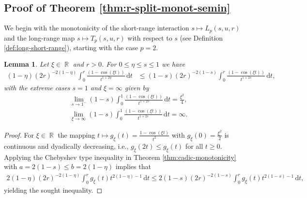 \documentclass[12pt, reqno]{amsart}%
\theoremstyle{plain}  %
\newtheorem{lemma}[theorem]{Lemma}
\theoremstyle{definition}  %
\theoremstyle{remark}
\numberwithin{equation}{section}
\DeclareMathOperator{\R}{\mathbb{R}}
\renewcommand{\d}{\,\mathrm{d}}
\begin{document}
\subsection{Proof of Theorem \ref{thm:r-split-monot-semin}} \label{sec:r-split-monot-semin}
We begin with the monotonicity of the short-range interaction $s \mapsto L_p(s,u,r)$ and the long-range map $s \mapsto T_p(s,u,r)$ with respect to $s$ (see Definition \ref{def:long-short-range}), starting with the case $p=2$.
\begin{lemma}\label{lem:short-cos}
Let  $\xi\in\R$ and $r>0$.  For $0\leq \eta\leq s\leq 1$ we have
\begin{align*}
(1-\eta) (2r)^{-2(1-\eta)} \int_0^r\frac{(1-\cos (\xi t))}{t^{1+2\eta}}\d t&\leq (1-s)  (2r)^{-2(1-s)} \int_0^r \frac{(1-\cos (\xi t))}{t^{1+2s}}\d t,
\end{align*}
with the extreme cases $s=1$ and $\xi=\infty$  given by
\begin{align*}
&\lim_{s\to 1^-}(1-s)  \int_0^1 \frac{(1-\cos (\xi t))}{t^{1+2s}}\d t=\frac{\xi^2}{4},\\
&\lim_{\xi\to \infty}(1-s) \int_0^1 \frac{(1-\cos (\xi t))}{t^{1+2s}}\d t =\infty.
\end{align*}
\end{lemma}
\begin{proof}
For $\xi\in \R$ the mapping $t\mapsto g_\xi(t) =\frac{1-\cos (\xi t)}{t^2}$ with $ g_\xi(0)= \frac{\xi^2}{ 2}$ is continuous and  dyadically decreasing, i.e., $g_\xi(2t)\leq g_\xi(t)$ for all $t\geq 0$. Applying the Chebyshev type inequality in Theorem \ref{thm:cadic-monotonicity} with $a=2(1-s)\leq b=2(1-\eta)$ implies that
\begin{align*}
2(1-\eta)(2 r)^{-2(1-\eta)} \int_0^{r} g_\xi(t) t^{2(1-\eta)-1}\d t\leq 2(1-s)(2 r)^{-2(1-s)}\int_0^r  g_\xi(t)t^{2(1-s)-1} \d t,
\end{align*}
yielding the sought inequality.
\end{proof}
\end{document}
